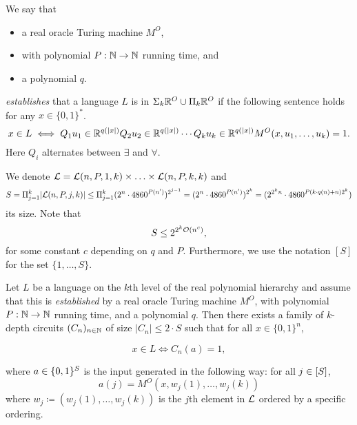 \documentclass{article}
\begin{document}
\begin{definition}
\label{def:CertificationLevelMembership}
    We say that 
\begin{itemize}[itemsep = 0pt]
    \item a real oracle Turing machine $M^O$,
    \item with polynomial $P: \mathbb{N} \rightarrow \mathbb{N}$ running time, and
    \item a polynomial $q$.
\end{itemize}
\textit{establishes} 
that a language $L$ is in
$\Sigma_{k}\mathbb{R}^O \cup \Pi_{k}\mathbb{R}^O$
if
the following sentence holds for any $x\in \{0,1\}^*$.
\begin{equation*}
    x \in L \iff Q_1 u_1 \in \mathbb{R}^{q(|x|)} Q_2 u_2 \in \mathbb{R}^{q(|x|)} \cdots Q_k u_k \in \mathbb{R}^{q(|x|)} M^{O}(x, u_1,\ldots,u_k)=1.
\end{equation*}
Here $Q_i$ alternates between $\exists$ and $\forall$.
\end{definition}

We denote $\mathcal{L} = \mathcal{L}(n,P,1,k)\times \ldots \times \mathcal{L}(n,P,k,k)$
and 
\[S = \Pi_{j=1}^{k} | \mathcal{L}(n,P,j,k)| \leq \Pi_{j=1}^{k} (2^n \cdot 4860^{P(n')})^{2^{j-1}} = (2^{n} \cdot 4860^{P(n')})^{2^{k}}
= (2^{2^k n} \cdot 4860^{P(k\cdot q(n)+n) 2^{k}})
\] its size.
Note that 
\[S \leq 2^{2^k\mathcal{O}( n^c)}, \]
for some constant $c$ depending on $q$ and $P$.
Furthermore, we use the notation $[S]$ for the set $\{1,\ldots, S\}$.





\begin{theorem}
\label{thm:RPHandACanalogue}

Let $L$ be a language on the $k$th level of the real polynomial hierarchy and assume that this is \emph{established} by a
real oracle Turing machine $M^O$, with polynomial $P: \mathbb{N} \rightarrow \mathbb{N}$ running time, and a polynomial $q$. Then there exists a family of $k$-depth circuits $(C_n)_{n\in \mathbb{N}}$ of size 
$|C_n| \leq 2 \cdot S$
such that for all \(x \in \{0,1\}^n\),

    \[x\in L \Leftrightarrow C_{n}(a) = 1,\]
    
where 
$a \in \{0,1\}^{S}$ 
is the input generated in the following way: for all $j \in [S]$,
\begin{equation*}
    a(j)=M^O(x, w_j(1), \ldots, w_j(k))
\end{equation*}
where $w_j \coloneqq (w_j(1),\ldots,w_j(k))$ is the $j$th element in 
$\mathcal{L}$
ordered by a specific ordering.
\end{theorem}
\end{document}
